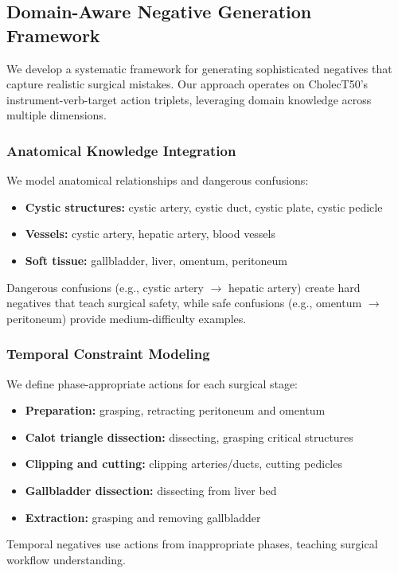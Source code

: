 \documentclass[runningheads]{llncs}
\begin{document}
\subsection{Domain-Aware Negative Generation Framework}

We develop a systematic framework for generating sophisticated negatives that capture realistic surgical mistakes. Our approach operates on CholecT50's instrument-verb-target action triplets, leveraging domain knowledge across multiple dimensions.

\subsubsection{Anatomical Knowledge Integration}
We model anatomical relationships and dangerous confusions:
\begin{itemize}
\item \textbf{Cystic structures:} cystic artery, cystic duct, cystic plate, cystic pedicle
\item \textbf{Vessels:} cystic artery, hepatic artery, blood vessels
\item \textbf{Soft tissue:} gallbladder, liver, omentum, peritoneum
\end{itemize}

Dangerous confusions (e.g., cystic artery $\rightarrow$ hepatic artery) create hard negatives that teach surgical safety, while safe confusions (e.g., omentum $\rightarrow$ peritoneum) provide medium-difficulty examples.

\subsubsection{Temporal Constraint Modeling}
We define phase-appropriate actions for each surgical stage:
\begin{itemize}
\item \textbf{Preparation:} grasping, retracting peritoneum and omentum
\item \textbf{Calot triangle dissection:} dissecting, grasping critical structures
\item \textbf{Clipping and cutting:} clipping arteries/ducts, cutting pedicles
\item \textbf{Gallbladder dissection:} dissecting from liver bed
\item \textbf{Extraction:} grasping and removing gallbladder
\end{itemize}

Temporal negatives use actions from inappropriate phases, teaching surgical workflow understanding.
\end{document}
